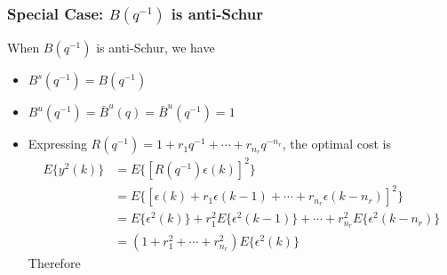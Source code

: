 \begin{frame}
    \frametitle{Special Case: $B(q^{-1})$ is anti-Schur}

    When $B(q^{-1})$ is anti-Schur, we have
    \begin{itemize}
        \item
        $B^s(q^{-1}) = B(q^{-1})$

        \item
        $B^u(q^{-1}) = \bar{B}^u(q) = \bar{B}^u(q^{-1}) = 1$
        \pause

        \item
        Expressing $R(q^{-1}) = 1 + r_1 q^{-1} + \cdots + r_{n_r} q^{-n_r}$, the optimal cost is
        \begin{align*}
            E\{y^2(k)\}
            & = E\{[R(q^{-1})\epsilon(k)]^2\} \\
            & = E\{[\epsilon(k) + r_1 \epsilon(k-1) + \cdots + r_{n_r} \epsilon(k-n_r)]^2 \} \\
            & = E\{\epsilon^2(k)\} + r_1^2 E\{\epsilon^2(k-1)\} + \cdots + r_{n_r}^2 E\{\epsilon^2(k-n_r)\} \\
            & = (1 + r_1^2 + \cdots + r_{n_r}^2) E\{\epsilon^2(k)\}
        \end{align*}
        \pause
        Therefore

    \end{itemize}
\end{frame}
